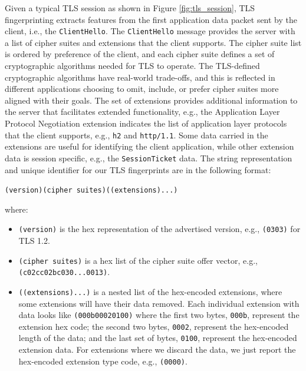 \documentclass{book}
\begin{document}
Given a typical TLS session as shown in Figure \ref{fig:tls_session}, TLS fingerprinting extracts features from the first application data packet sent by the client, i.e., the \texttt{ClientHello}. The \texttt{ClientHello} message provides the server with a list of cipher suites and extensions that the client supports. The cipher suite list is ordered by preference of the client, and each cipher suite defines a set of cryptographic algorithms needed for TLS to operate. The TLS-defined cryptographic algorithms have real-world trade-offs, and this is reflected in different applications choosing to omit, include, or prefer cipher suites more aligned with their goals. The set of extensions provides additional information to the server that facilitates extended functionality, e.g., the Application Layer Protocol Negotiation extension indicates the list of application layer protocols that the client supports, e.g., \texttt{h2} and \texttt{http/1.1}. Some data carried in the extensions are useful for identifying the client application, while other extension data is session specific, e.g., the \texttt{SessionTicket} data. The string representation and unique identifier for our TLS fingerprints are in the following format:

\vspace{2mm}
\hspace{2mm}\texttt{(version)(cipher suites)((extensions)...)}
\vspace{2mm}

where:

\begin{itemize}
\item \texttt{(version)} is the hex representation of the advertised version, e.g., \texttt{(0303)} for TLS 1.2.
\item \texttt{(cipher suites)} is a hex list of the cipher suite offer vector, e.g., \texttt{(c02cc02bc030...0013)}.
\item \texttt{((extensions)...)} is a nested list of the hex-encoded extensions, where some extensions will have their data removed. Each individual extension with data looks like \texttt{(000b00020100)} where the first two bytes, \texttt{000b}, represent the extension hex code; the second two bytes, \texttt{0002}, represent the hex-encoded length of the data; and the last set of bytes, \texttt{0100}, represent the hex-encoded extension data. For extensions where we discard the data, we just report the hex-encoded extension type code, e.g., \texttt{(0000)}.
\end{itemize}
\end{document}
